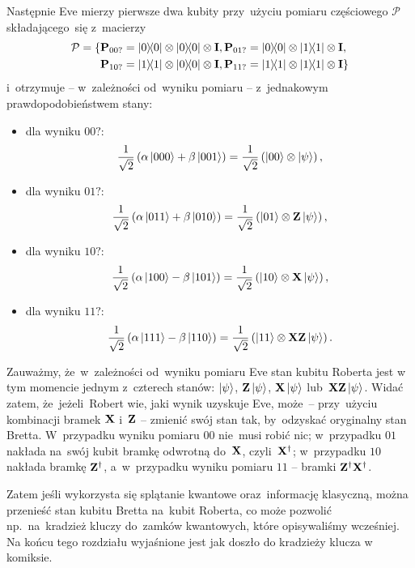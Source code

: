 Następnie Eve mierzy pierwsze dwa kubity przy~użyciu pomiaru częściowego $\mathcal{P}$ składającego~się z~macierzy
\begin{equation*}
	\begin{split}
		\mathcal{P} = \{&\mathbf{P}_{00?}=\ketbra{0}{0}\otimes\ketbra{0}{0}\otimes\mathbf{I}, \mathbf{P}_{01?}=\ketbra{0}{0}\otimes\ketbra{1}{1}\otimes\mathbf{I}, \\
		&\mathbf{P}_{10?}=\ketbra{1}{1}\otimes\ketbra{0}{0}\otimes\mathbf{I}, \mathbf{P}_{11?}=\ketbra{1}{1}\otimes\ketbra{1}{1}\otimes\mathbf{I}\}
	\end{split}
\end{equation*}
i~otrzymuje -- w~zależności od~wyniku pomiaru -- z~jednakowym prawdopodobieństwem stany:
\begin{itemize}
	\item dla wyniku $00?$: $$\frac{1}{\sqrt{2}}\left(\alpha \ket{000}  + \beta \ket{001}\right) = \frac{1}{\sqrt{2}}\left(\ket{00}\otimes \ket{\psi}\right),$$
	\item dla wyniku $01?$: $$\frac{1}{\sqrt{2}}\left(\alpha \ket{011}  + \beta \ket{010}\right) = \frac{1}{\sqrt{2}}\left(\ket{01}\otimes \mathbf{Z}\ket{\psi}\right),$$
	\item dla wyniku $10?$: $$\frac{1}{\sqrt{2}}\left(\alpha \ket{100}  - \beta \ket{101}\right) = \frac{1}{\sqrt{2}}\left(\ket{10}\otimes \mathbf{X}\ket{\psi}\right),$$
	\item dla wyniku $11?$: $$\frac{1}{\sqrt{2}}\left(\alpha \ket{111}  - \beta \ket{110}\right) = \frac{1}{\sqrt{2}}\left(\ket{11}\otimes \mathbf{X}\mathbf{Z}\ket{\psi}\right).$$
\end{itemize}

Zauważmy, że~w~zależności od~wyniku pomiaru Eve stan kubitu Roberta jest
w tym momencie jednym z~czterech stanów: $\ket{\psi}$,
$\mathbf{Z}\ket{\psi}$, $\mathbf{X}\ket{\psi}$ lub~$\mathbf{X}\mathbf{Z}\ket{\psi}$.
Widać zatem, że~jeżeli~Robert wie, jaki wynik uzyskuje Eve, może~--
przy~użyciu kombinacji bramek $\mathbf{X}$ i~$\mathbf{Z}$ -- zmienić swój stan
tak, by~odzyskać oryginalny stan Bretta. W~przypadku wyniku pomiaru $00$
nie~musi robić nic; w~przypadku $01$ nakłada na~swój kubit bramkę
odwrotną do~$\mathbf{X}$, czyli~$\mathbf{X}^\dagger$; w~przypadku $10$ nakłada
bramkę $\mathbf{Z}^\dagger$, a~w~przypadku wyniku pomiaru $11$ -- bramki
$\mathbf{Z}^\dagger \mathbf{X}^\dagger$.

Zatem jeśli wykorzysta się splątanie kwantowe oraz~informację klasyczną, można
przenieść stan kubitu Bretta na~kubit Roberta, co może pozwolić
np.~na~kradzież kluczy do~zamków kwantowych, które opisywaliśmy
wcześniej. Na końcu tego rozdziału wyjaśnione jest jak doszło do kradzieży
klucza w komiksie.
